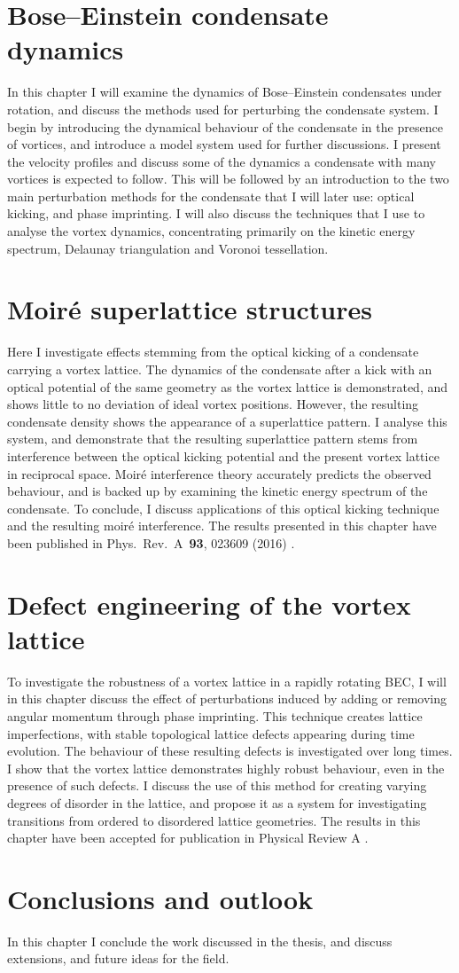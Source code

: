 \section*{Bose--Einstein condensate dynamics}
In this chapter I will examine the dynamics of Bose--Einstein condensates under rotation, and discuss the methods used for perturbing the condensate system. I begin by introducing the dynamical behaviour of the condensate in the presence of vortices, and introduce a model system used for further discussions. I present the velocity profiles and discuss some of the dynamics a condensate with many vortices is expected to follow. This will be followed by an introduction to the two main perturbation methods for the condensate that I will later use: optical kicking, and phase imprinting. I will also discuss the techniques that I use to analyse the vortex dynamics, concentrating primarily on the kinetic energy spectrum, Delaunay triangulation and Voronoi tessellation.

\section*{Moir\'e superlattice structures}
Here I investigate effects stemming from the optical kicking of a condensate carrying a vortex lattice. The dynamics of the condensate after a kick with an optical potential of the same geometry as the vortex lattice is demonstrated, and shows little to no deviation of ideal vortex positions. However, the resulting condensate density shows the appearance of a superlattice pattern. I analyse this system, and demonstrate that the resulting superlattice pattern stems from interference between the optical kicking potential and the present vortex lattice in reciprocal space. Moir\'e interference theory accurately predicts the observed behaviour, and is backed up by examining the kinetic energy spectrum of the condensate. To conclude, I discuss applications of this optical kicking technique and the resulting moir\'e interference. The results presented in this chapter have been published in Phys.~Rev.~A~\textbf{93}, 023609 (2016) \cite{VTX:oriordan_pra_2016}.

\section*{Defect engineering of the vortex lattice}
To investigate the robustness of a vortex lattice in a rapidly rotating BEC, I will in this chapter discuss the effect of perturbations induced by adding or removing angular momentum through phase imprinting. This technique creates lattice imperfections, with stable topological lattice defects appearing during time evolution. The behaviour of these resulting defects is investigated over long times. I show that the vortex lattice demonstrates highly robust behaviour, even in the presence of such defects. I discuss the use of this method for creating varying degrees of disorder in the lattice, and propose it as a system for investigating transitions from ordered to disordered lattice geometries. The results in this chapter have been accepted for publication in Physical Review A \cite{ME:arxiv_defect}.

\section*{Conclusions and outlook}
In this chapter I conclude the work discussed in the thesis, and discuss extensions, and future ideas for the field.
